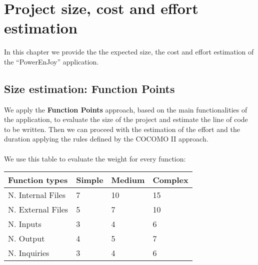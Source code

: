 \pagebreak
\section{Project size, cost and effort estimation}

In this chapter we provide the the expected size, the cost and effort estimation of the ``PowerEnJoy'' application.

\subsection{Size estimation: Function Points}

We apply the \textbf{Function Points} approach, based on the main functionalities of the application, to evaluate the size of the project and estimate the line of code to be written. Then  we can proceed with the estimation of the effort and the duration applying the rules defined by the COCOMO II approach. \\
\\
We use this table to evaluate the weight for every function: \\

\begin{tabular}{|l|l|l|l|}
	\hline
	\textbf{Function types} 	& \textbf{Simple} 	& \textbf{Medium} 	& \textbf{Complex} \\
	\hline \hline
	N. Internal Files 	& 7 	& 10 	& 15 \\
	\hline
	N. External Files 	& 5 	& 7 	& 10 \\
	\hline
	N. Inputs 	& 3 	& 4 	& 6 \\
	\hline
	N. Output 	& 4 	& 5 	& 7 \\
	\hline
	N. Inquiries 	& 3 	& 4 	& 6 \\	
	\hline
\end{tabular}

